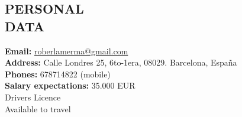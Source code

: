 \documentclass[line,margin]{res}
\begin{document}
\begin{resume}
 
\section{PERSONAL \\ DATA}  
               \textbf{Email:} \href{mailto:roberlamerma@gmail.com}{roberlamerma@gmail.com}\\
               \textbf{Address:} Calle Londres 25, 6to-1era, 08029. Barcelona, Espa\~{n}a\\
               \textbf{Phones:} 678714822 (mobile)\\
               \textbf{Salary expectations:} 35.000 EUR\\
               Drivers Licence\\
               Available to travel\\


\end{resume}
\end{document}
